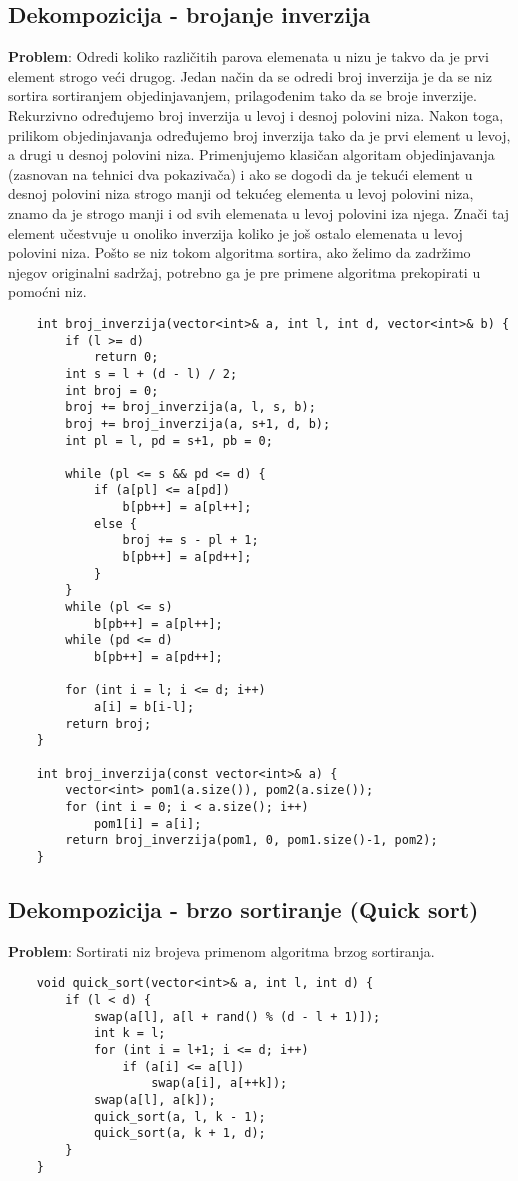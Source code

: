 \documentclass{article}
\begin{document}
\subsection{Dekompozicija - brojanje inverzija}
\textbf{Problem}: Odredi koliko različitih parova elemenata u nizu je takvo da je prvi
element strogo veći drugog.
\newline
Jedan način da se odredi broj inverzija je da se niz sortira sortiranjem objedinjavanjem, prilagođenim tako da se broje inverzije. Rekurzivno određujemo
broj inverzija u levoj i desnoj polovini niza. Nakon toga, prilikom objedinjavanja
određujemo broj inverzija tako da je prvi element u levoj, a drugi u desnoj
polovini niza. Primenjujemo klasičan algoritam objedinjavanja (zasnovan na
tehnici dva pokazivača) i ako se dogodi da je tekući element u desnoj polovini
niza strogo manji od tekućeg elementa u levoj polovini niza, znamo da je strogo manji i od svih elemenata u levoj polovini iza njega. Znači taj element učestvuje
u onoliko inverzija koliko je još ostalo elemenata u levoj polovini niza. Pošto se
niz tokom algoritma sortira, ako želimo da zadržimo njegov originalni sadržaj,
potrebno ga je pre primene algoritma prekopirati u pomoćni niz.
\begin{lstlisting}
    int broj_inverzija(vector<int>& a, int l, int d, vector<int>& b) {
        if (l >= d)
            return 0;
        int s = l + (d - l) / 2;
        int broj = 0;
        broj += broj_inverzija(a, l, s, b);
        broj += broj_inverzija(a, s+1, d, b);
        int pl = l, pd = s+1, pb = 0;
       
        while (pl <= s && pd <= d) {
            if (a[pl] <= a[pd])
                b[pb++] = a[pl++];
            else {
                broj += s - pl + 1;
                b[pb++] = a[pd++];
            }
        }
        while (pl <= s)
            b[pb++] = a[pl++];
        while (pd <= d)
            b[pb++] = a[pd++];
        
        for (int i = l; i <= d; i++)
            a[i] = b[i-l];
        return broj;
    }

    int broj_inverzija(const vector<int>& a) {
        vector<int> pom1(a.size()), pom2(a.size());
        for (int i = 0; i < a.size(); i++)
            pom1[i] = a[i];
        return broj_inverzija(pom1, 0, pom1.size()-1, pom2);
    }
\end{lstlisting}

\subsection{Dekompozicija - brzo sortiranje (Quick sort)}
\textbf{Problem}: Sortirati niz brojeva primenom algoritma brzog sortiranja.
\begin{lstlisting}
    void quick_sort(vector<int>& a, int l, int d) {
        if (l < d) {
            swap(a[l], a[l + rand() % (d - l + 1)]);
            int k = l;
            for (int i = l+1; i <= d; i++)
                if (a[i] <= a[l])
                    swap(a[i], a[++k]);
            swap(a[l], a[k]);
            quick_sort(a, l, k - 1);
            quick_sort(a, k + 1, d);
        }
    }
\end{lstlisting}
\end{document}
